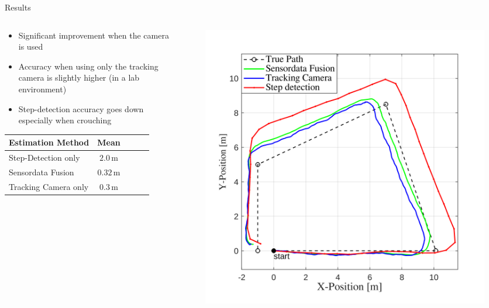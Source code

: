 \documentclass[aspectratio=169]{beamer}
\begin{document}
{	\begin{frame}{Results}
		\begin{columns}
			\begin{column}{0.45\textwidth}
				\begin{itemize}
					\item Significant improvement when the camera is used
					\item Accuracy when using only the tracking camera is slightly higher (in a lab environment)
					\item Step-detection accuracy goes down especially when crouching
				\end{itemize}
				\begin{tabular}{lcccc}
					\toprule
					\textbf{Estimation Method}                  &   \textbf{Mean}      \\ \midrule
					Step-Detection only                              & $2.0\,\mathrm{m}$   \\
					Sensordata Fusion                           & $0.32\,\mathrm{m}$   \\
					Tracking Camera only & $0.3\,\mathrm{m}$  \\ \bottomrule
				\end{tabular}
			\end{column}
			\begin{column}{0.54\textwidth}
				\begin{figure}
					\centering
					\includegraphics[width=0.9\linewidth]{../Conference_Paper/Path2}
				\end{figure}
				

\end{column}
\end{columns}
\end{frame}}
\end{document}
